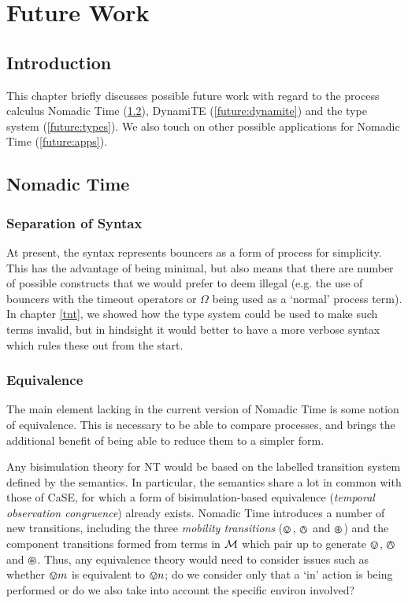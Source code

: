 \chapter{Future Work}
\label{futurework}

\section{Introduction}

This chapter briefly discusses possible future work with regard to the
process calculus Nomadic Time (\ref{future:nt}), DynamiTE
(\ref{future:dynamite}) and the type system (\ref{future:types}).  We
also touch on other possible applications for Nomadic Time
(\ref{future:apps}).

\section{Nomadic Time}
\label{future:nt}

\subsection{Separation of Syntax}

At present, the syntax represents bouncers as a form of process for
simplicity.  This has the advantage of being minimal, but also means
that there are number of possible constructs that we would prefer to
deem illegal (e.g. the use of bouncers with the timeout operators or
$\Omega$ being used as a `normal' process term).  In chapter
\ref{tnt}, we showed how the type system could be used to make such
terms invalid, but in hindsight it would better to have a more verbose
syntax which rules these out from the start.

\subsection{Equivalence}
\label{future:equiv}

The main element lacking in the current version of Nomadic Time is
some notion of equivalence.  This is necessary to be able to compare
processes, and brings the additional benefit of being able to reduce
them to a simpler form.

Any bisimulation theory for NT would be based on the labelled
transition system defined by the semantics.  In particular, the
semantics share a lot in common with those of CaSE, for which a form
of bisimulation-based equivalence (\emph{temporal observation
  congruence}) already exists.  Nomadic Time introduces a number of
new transitions, including the three \emph{mobility transitions}
($\varovee$, $\varowedge$ and $\varoast$) and the component transitions formed
from terms in $\text{$\mathcal{M}$}$ which pair up to generate $\varovee$, $\varowedge$ and
$\varoast$.  Thus, any equivalence theory would need to consider issues
such as whether $\varovee m$ is equivalent to $\varovee n$; do we
consider only that a `in' action is being performed or do we also take
into account the specific environ involved?

